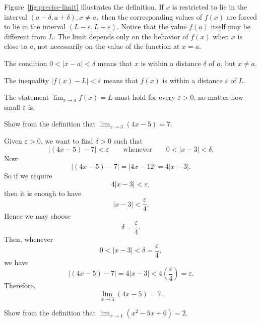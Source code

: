 Figure~\ref{fig:precise-limit} illustrates the definition. If \(x\) is restricted to lie in the interval
\(\displaystyle
(a-\delta,a+\delta),
x\ne a,
\)
then the corresponding values of \(f(x)\) are forced to lie in the interval
\(\displaystyle
(L-\varepsilon,L+\varepsilon).
\)
Notice that the value \(f(a)\) itself may be different from \(L\). The limit depends only on the behavior of \(f(x)\) when \(x\) is close to \(a\), not necessarily on the value of the function at \(x=a\).

\begin{remark}
The condition
\(\displaystyle
0<|x-a|<\delta
\)
means that \(x\) is within a distance \(\delta\) of \(a\), but \(x\ne a\).
\end{remark}

\begin{remark}
The inequality
\(\displaystyle
|f(x)-L|<\varepsilon
\)
means that \(f(x)\) is within a distance \(\varepsilon\) of \(L\).
\end{remark}

\begin{remark}
The statement
\(\displaystyle
\lim_{x\to a} f(x)=L
\)
must hold for every \(\varepsilon>0\), no matter how small \(\varepsilon\) is.
\end{remark}

\begin{example}
Show from the definition that
\(\displaystyle
\lim_{x\to 3} (4x-5)=7.
\)
\end{example}

\begin{solution}
Given \(\varepsilon>0\), we want to find \(\delta>0\) such that
\[
|(4x-5)-7|<\varepsilon
\qquad \text{whenever} \qquad
0<|x-3|<\delta.
\]
Now
\[
|(4x-5)-7|
=
|4x-12|
=
4|x-3|.
\]
So if we require
\[
4|x-3|<\varepsilon,
\]
then it is enough to have
\[
|x-3|<\frac{\varepsilon}{4}.
\]
Hence we may choose
\[
\delta=\frac{\varepsilon}{4}.
\]
Then, whenever
\[
0<|x-3|<\delta=\frac{\varepsilon}{4},
\]
we have
\[
|(4x-5)-7|
=
4|x-3|
<
4\left(\frac{\varepsilon}{4}\right)
=
\varepsilon.
\]
Therefore,
\[
\lim_{x\to 3} (4x-5)=7.
\]
\end{solution}

\begin{example}
Show from the definition that
\(\displaystyle
\lim_{x\to 1} (x^{2}-5x+6)=2.
\)
\end{example}

